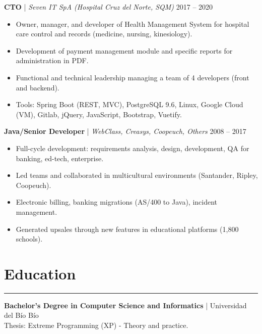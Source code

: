 \documentclass[11pt,a4paper]{article}
\begin{document}
\vspace{8pt}

\textbf{CTO} | \textit{Seven IT SpA (Hospital Cruz del Norte, SQM)} \hfill 2017 -- 2020 \\
\begin{itemize}[noitemsep, topsep=0pt]
    \item Owner, manager, and developer of Health Management System for hospital care control and records (medicine, nursing, kinesiology).
    \item Development of payment management module and specific reports for administration in PDF.
    \item Functional and technical leadership managing a team of 4 developers (front and backend).
    \item Tools: Spring Boot (REST, MVC), PostgreSQL 9.6, Linux, Google Cloud (VM), Gitlab, jQuery, JavaScript, Bootstrap, Vuetify.
\end{itemize}

\vspace{8pt}

\textbf{Java/Senior Developer} | \textit{WebClass, Creasys, Coopeuch, Others} \hfill 2008 -- 2017 \\
\begin{itemize}[noitemsep, topsep=0pt]
    \item Full-cycle development: requirements analysis, design, development, QA for banking, ed-tech, enterprise.
    \item Led teams and collaborated in multicultural environments (Santander, Ripley, Coopeuch).
    \item Electronic billing, banking migrations (AS/400 to Java), incident management.
    \item Generated upsales through new features in educational platforms (1,800 schools).
\end{itemize}

\section*{Education}
\hrule
\vspace{5pt}
\textbf{Bachelor's Degree in Computer Science and Informatics} | Universidad del Bío Bío \\
Thesis: Extreme Programming (XP) - Theory and practice.
\end{document}
